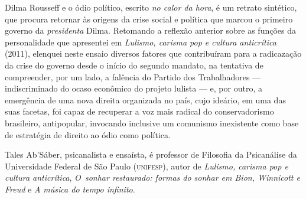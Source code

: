 \begin{resumopage}


\item[Dilma Rousseff e o ódio político,] escrito \emph{no calor da hora}, é um
  retrato sintético, que procura retornar às origens da crise social e política
  que marcou o primeiro governo da \emph{presidenta} Dilma.  Retomando a
  reflexão anterior sobre as funções da personalidade que apresentei em
  \emph{Lulismo, carisma pop e cultura anticrítica} (2011), elenquei neste ensaio
  diversos fatores que contribuíram para a radicazação da crise do governo
  desde o início do segundo mandato, na tentativa de compreender, por um lado,
  a falência do Partido dos Trabalhadores — indiscriminado do ocaso econômico
  do projeto lulista — e, por outro, a emergência de uma nova direita
  organizada no país, cujo ideário, em uma das suas facetas, foi capaz de
  recuperar a voz mais radical do conservadorismo brasileiro, antipopular,
  invocando inclusive um comunismo inexistente como base de estratégia de
  direito ao ódio como política.  

\item[Tales Ab’Sáber,] psicanalista e ensaísta, é professor de Filosofia da Psicanálise da Universidade Federal 
de São Paulo (\textsc{unifesp}), autor de 
\emph{Lulismo, carisma pop e cultura anticrítica},
\textit{O~sonhar
restaurado: formas do sonhar em Bion, Winnicott e Freud} e
\textit{A música do tempo infinito}. 

\end{resumopage}

